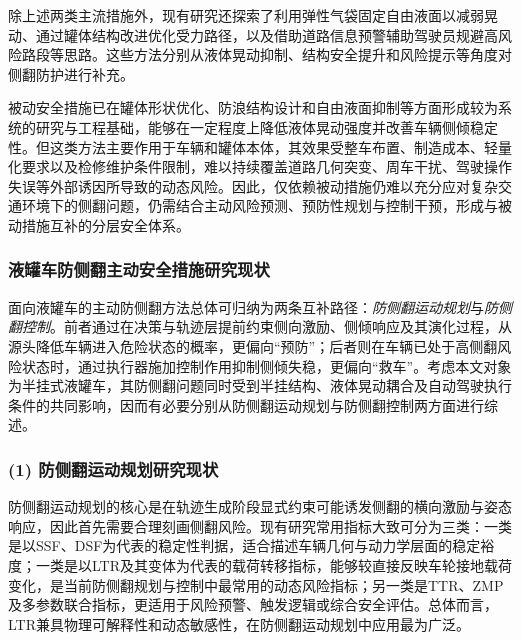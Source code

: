       除上述两类主流措施外，现有研究还探索了利用弹性气袋固定自由液面以减弱晃动\cite{wangqiongyao2017sloshing}、通过罐体结构改进优化受力路径\cite{fangliang2022fe}，以及借助道路信息预警辅助驾驶员规避高风险路段\cite{zhangweihua2019gist}等思路。这些方法分别从液体晃动抑制、结构安全提升和风险提示等角度对侧翻防护进行补充。


      被动安全措施已在罐体形状优化、防浪结构设计和自由液面抑制等方面形成较为系统的研究与工程基础，能够在一定程度上降低液体晃动强度并改善车辆侧倾稳定性。但这类方法主要作用于车辆和罐体本体，其效果受整车布置、制造成本、轻量化要求以及检修维护条件限制，难以持续覆盖道路几何突变、周车干扰、驾驶操作失误等外部诱因所导致的动态风险。因此，仅依赖被动措施仍难以充分应对复杂交通环境下的侧翻问题，仍需结合主动风险预测、预防性规划与控制干预，形成与被动措施互补的分层安全体系。
   
            
    \subsubsection{液罐车防侧翻主动安全措施研究现状}
    \label{subsub:active_safty}

      面向液罐车的主动防侧翻方法总体可归纳为两条互补路径：\emph{防侧翻运动规划}与\emph{防侧翻控制}。前者通过在决策与轨迹层提前约束侧向激励、侧倾响应及其演化过程，从源头降低车辆进入危险状态的概率，更偏向“预防”；后者则在车辆已处于高侧翻风险状态时，通过执行器施加控制作用抑制侧倾失稳，更偏向“救车”。考虑本文对象为半挂式液罐车，其防侧翻问题同时受到半挂结构、液体晃动耦合及自动驾驶执行条件的共同影响，因而有必要分别从防侧翻运动规划与防侧翻控制两方面进行综述。

      \subsubsection*{(1) 防侧翻运动规划研究现状}

      防侧翻运动规划的核心是在轨迹生成阶段显式约束可能诱发侧翻的横向激励与姿态响应，因此首先需要合理刻画侧翻风险。现有研究常用指标大致可分为三类：一类是以SSF、DSF为代表的稳定性判据，适合描述车辆几何与动力学层面的稳定裕度\cite{huston2014ssf,jin2007critical,heyuancha0_2010factor}；一类是以LTR及其变体为代表的载荷转移指标，能够较直接反映车轮接地载荷变化，是当前防侧翻规划与控制中最常用的动态风险指标\cite{zhang2016pulsed,zhao2019hinfty,jin2021heavytruck}；另一类是TTR、ZMP及多参数联合指标，更适用于风险预警、触发逻辑或综合安全评估\cite{wanying2020antirolover,zeng2017bpnn,jinliqiang2017yujing,jin2016tripped,jin2019triaxle,imine2015switched}。总体而言，LTR兼具物理可解释性和动态敏感性，在防侧翻运动规划中应用最为广泛。

